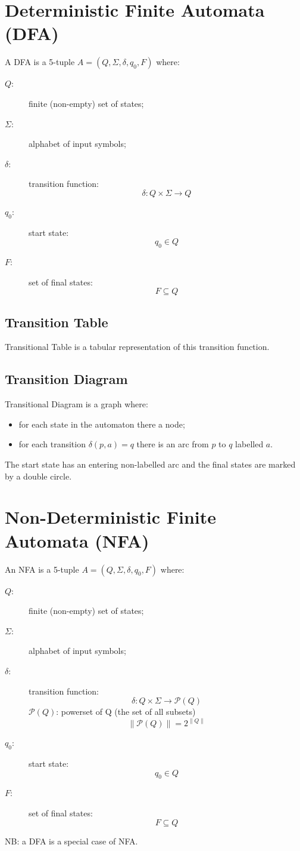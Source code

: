 \section{Deterministic Finite Automata (DFA)}
A DFA is a 5-tuple $A = (Q, \Sigma, \delta, q_0, F)$ where:
\begin{description}
    \item[$Q:$] finite (non-empty) set of states;
    \item[$\Sigma:$] alphabet of input symbols;
    \item[$\delta:$] transition function:
        $$
            \delta: Q \times \Sigma \to Q
        $$
    \item[$q_0:$] start state:
        $$
            q_0 \in Q
        $$
    \item[$F:$] set of final states:
        $$
            F \subseteq Q
        $$
\end{description}

\subsection{Transition Table}
Transitional Table is a tabular representation of this transition function.

\subsection{Transition Diagram}
Transitional Diagram is a graph where:
\begin{itemize}
    \item for each state in the automaton there a node;
    \item for each transition $\delta(p, a) = q$ there is an arc from $p$ to $q$ labelled $a$.
\end{itemize}
The start state has an entering non-labelled arc and the final states are marked by a double circle.

\section{Non-Deterministic Finite Automata (NFA)}
An NFA is a 5-tuple $A = (Q, \Sigma, \delta, q_0, F)$ where:
\begin{description}
    \item[$Q:$] finite (non-empty) set of states;
    \item[$\Sigma:$] alphabet of input symbols;
    \item[$\delta:$] transition function:
        $$
            \delta: Q \times \Sigma \to \mathscr{P}(Q)
        $$
        $\mathscr{P}(Q)$: powerset of Q (the set of all subsets)
        $$
            \|\mathscr{P}(Q)\| = 2^{\|Q\|}
        $$
    \item[$q_0:$] start state:
        $$
            q_0 \in Q
        $$
    \item[$F:$] set of final states:
        $$
            F \subseteq Q
        $$
\end{description}
NB: a DFA is a special case of NFA.

